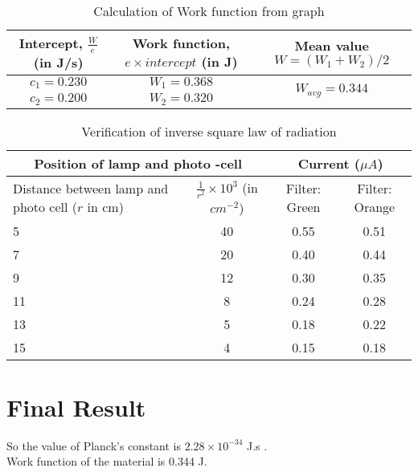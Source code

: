 \documentclass[a4paper,12pt]{article}
\begin{document}
\begin{table}[H]
    \def\arraystretch{2}
    \begin{center}
        \caption{Calculation of Work function from graph}
        \begin{tabular}{|c|c|c|}
            \hline
            Intercept, \(\frac{W}{e}\) (in J/s) & Work function, \(e \times intercept\) (in J) & Mean value \(W = (W_1 + W_2)/2\) \\
            \hline
            \(c_1 = 0.230\) & \(W_1 = 0.368\) & \multirow{2}{*}{\(W_{avg} = 0.344\)} \\
            \cline{1-2}
            \(c_2 = 0.200\) & \(W_2 = 0.320\) & \\
            \hline
        \end{tabular}
    \end{center}
\end{table}

\begin{table}[H]
    \def\arraystretch{2}
    \begin{center}
        \caption{Verification of inverse square law of radiation}
        \begin{tabular}{|p{1.25in}|c|c|c|}
            \hline
            \multicolumn{2}{|c|}{Position of lamp and photo -cell} & \multicolumn{2}{|c|}{Current (\(\mu A\))}\\
            \hline
            Distance between lamp and photo cell (\(r\) in cm) & \(\frac{1}{r^2} \times 10^3\) (in \(cm^{-2}\)) & Filter: Green & Filter: Orange \\
            \hline
            5 & 40 & 0.55 & 0.51 \\
            \hline
            7 & 20 & 0.40 & 0.44 \\
            \hline
            9 & 12 & 0.30 & 0.35 \\
            \hline
            11 & 8 & 0.24 & 0.28 \\
            \hline
            13 & 5 & 0.18 & 0.22 \\
            \hline
            15 & 4 & 0.15 & 0.18 \\
            \hline
        \end{tabular}
    \end{center}
\end{table}

\section{Final Result}
So the value of Planck's constant is \(2.28 \times 10^{-34} \) J.s .\\
Work function of the material is 0.344 J.
\end{document}
